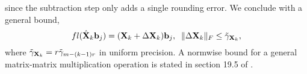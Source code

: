 since the subtraction step only adds a single rounding error. 
We conclude with a general bound, 
\begin{equation}
fl(\hat{\bb{X}}_{k}\bb{b}_j) = (\bb{X}_{k} + \Delta \bb{X}_{k})\bb{b}_j, \;\; \|\Delta \bb{X}_{k}\|_F \leq \tilde{\gamma}_{\bb{X}_k},\label{eqn:Xkbound}
\end{equation}
where $\tilde{\gamma}_{\mathbf{X}_k} = r\tilde{\gamma}_{m-(k-1)r}$ in uniform precision.
A normwise bound for a general matrix-matrix multiplication operation is stated in section 19.5 of \cite{Higham2002}.
